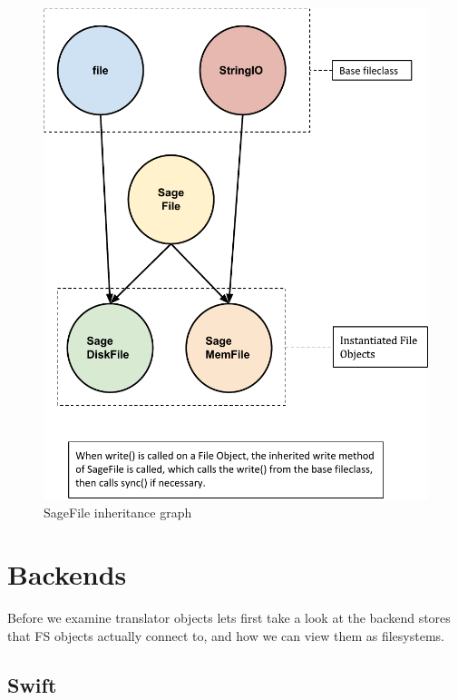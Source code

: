 \begin{figure}[h]
\centering
\includegraphics[scale=0.7]{figures/sagefile}
\caption{SageFile inheritance graph}
\label{fig:sagefile}
\end{figure}


\section{Backends}
\label{sec:backends}

Before we examine translator objects lets first take a look at the backend stores that
FS objects actually connect to, and how we can view them as filesystems.

\subsection{Swift}

